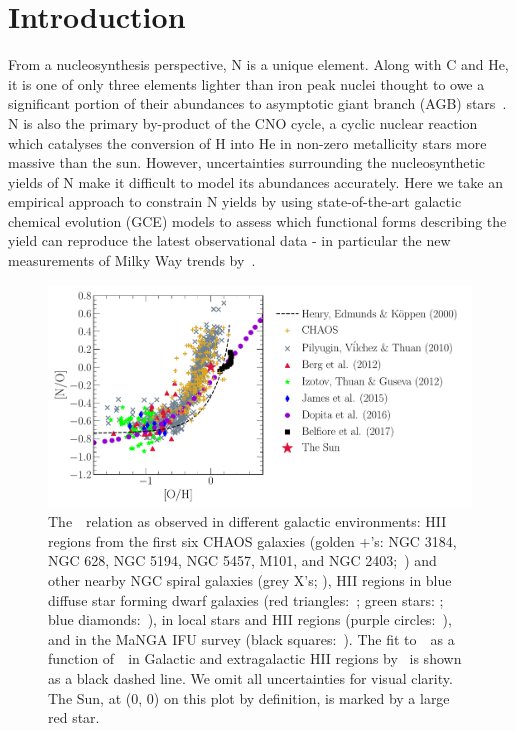 \documentclass[ms.tex]{subfiles}
\begin{document}
\section{Introduction}
\label{sec:intro}

From a nucleosynthesis perspective, N is a unique element.
Along with C and He, it is one of only three elements lighter
than iron peak nuclei thought to owe a significant portion of their abundances
to asymptotic giant branch (AGB) stars~\citep{Johnson2019}.
N is also the primary by-product of the CNO cycle, a cyclic nuclear reaction
which catalyses the conversion of H into He in non-zero metallicity
stars more massive than the sun.
However, uncertainties surrounding the nucleosynthetic yields of N make it
difficult to model its abundances accurately.
Here we take an empirical approach to constrain N yields by using
state-of-the-art galactic chemical evolution (GCE) models to assess which
functional forms describing the yield can reproduce the latest observational
data - in particular the new measurements of Milky Way trends
by~\citet{Vincenzo2021}.

\begin{figure}
\centering
\includegraphics[scale = 0.6]{no_oh_observed.pdf}
\caption{
	The~\ohno~relation as observed in different galactic environments:
	HII regions from the first six CHAOS galaxies (golden +'s: NGC 3184, NGC
	628, NGC 5194, NGC 5457, M101, and NGC 2403;~\citealp{Berg2020,
	Skillman2020, Rogers2021}) and other nearby NGC spiral galaxies (grey X's;
	\citealp{Pilyugin2010}), HII regions in blue diffuse star forming dwarf
	galaxies (red triangles:~\citealp{Berg2012}; green stars:
	\citealp{Izotov2012}; blue diamonds:~\citealp{James2015}), in local stars
	and HII regions (purple circles:~\citealp{Dopita2016}), and in the MaNGA
	IFU survey (black squares:~\citealp{Belfiore2017}).
	The fit to~\no~as a function of~\oh~in Galactic and extragalactic HII
	regions by~\citet{Henry2000} is shown as a black dashed line.
	We omit all uncertainties for visual clarity.
	The Sun, at (0, 0) on this plot by definition, is marked by a large red
	star. 
}
\label{fig:no_oh_observed}
\end{figure}
\end{document}
